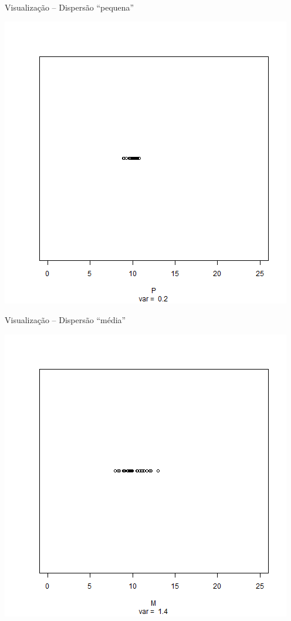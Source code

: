 \documentclass{beamer}
\begin{document}
\begin{frame}{\scriptsize Visualização -- Dispersão ``pequena''}
  \begin{center}
    \includegraphics[height=.8\textheight]{Cap17/dot-P}
  \end{center}
\end{frame}

\begin{frame}{\scriptsize Visualização -- Dispersão ``média''}
  \begin{center}
    \includegraphics[height=.8\textheight]{Cap17/dot-M}
  \end{center}
\end{frame}
\end{document}
